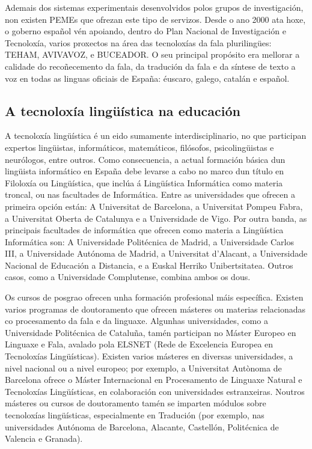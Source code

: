 \begin{multicols}{2}
Ademais dos sistemas experimentais desenvolvidos polos grupos de investigación, non existen PEMEs que ofrezan este tipo de servizos. Desde o ano 2000 ata hoxe, o goberno español vén apoiando, dentro do Plan Nacional de Investigación e Tecnoloxía, varios proxectos na área das tecnoloxías da fala plurilingües: TEHAM, AVIVAVOZ, e BUCEADOR. O seu principal propósito era mellorar a calidade do recoñecemento da fala, da tradución da fala e da síntese de texto a voz en todas as linguas oficiais de España: éuscaro, galego, catalán e español.

\subsection{A tecnoloxía lingüística na educación}

   A tecnoloxía lingüística é un eido sumamente interdisciplinario, no que participan expertos lingüistas, informáticos, matemáticos, filósofos, psicolingüistas e neurólogos, entre outros. Como consecuencia, a actual formación básica dun lingüista informático en España debe levarse a cabo no marco dun título en Filoloxía ou Lingüística, que inclúa á Lingüística Informática como materia troncal, ou nas facultades de Informática. Entre as universidades que ofrecen a primeira opción están: A Universitat de Barcelona, a Universitat Pompeu Fabra, a Universitat Oberta de Catalunya e a Universidade de Vigo. Por outra banda, as principais facultades de informática que ofrecen como materia a Lingüística Informática son: A Universidade Politécnica de Madrid, a Universidade Carlos III, a Universidade Autónoma de Madrid, a Universitat d’Alacant, a Universidade Nacional de Educación a Distancia, e a Euskal Herriko Unibertsitatea. Outros casos, como a Universidade Complutense, combina ambos os dous.

Os cursos de posgrao ofrecen unha formación profesional máis específica. Existen varios programas de doutoramento que ofrecen másteres ou materias relacionadas co procesamento da fala e da linguaxe. Algunhas universidades, como a Universidade Politécnica de Cataluña, tamén participan no Máster Europeo en Linguaxe e Fala, avalado pola ELSNET (Rede de Excelencia Europea en Tecnoloxías Lingüísticas). Existen varios másteres en diversas universidades, a nivel nacional ou a nivel europeo; por exemplo, a Universitat Autònoma de Barcelona ofrece o Máster Internacional en Procesamento de Linguaxe Natural e Tecnoloxías Lingüísticas, en colaboración con universidades estranxeiras. Noutros másteres ou cursos de doutoramento tamén se imparten módulos sobre tecnoloxías lingüísticas, especialmente en Tradución (por exemplo, nas universidades Autónoma de Barcelona, Alacante, Castellón, Politécnica de Valencia e Granada).


\end{multicols}
